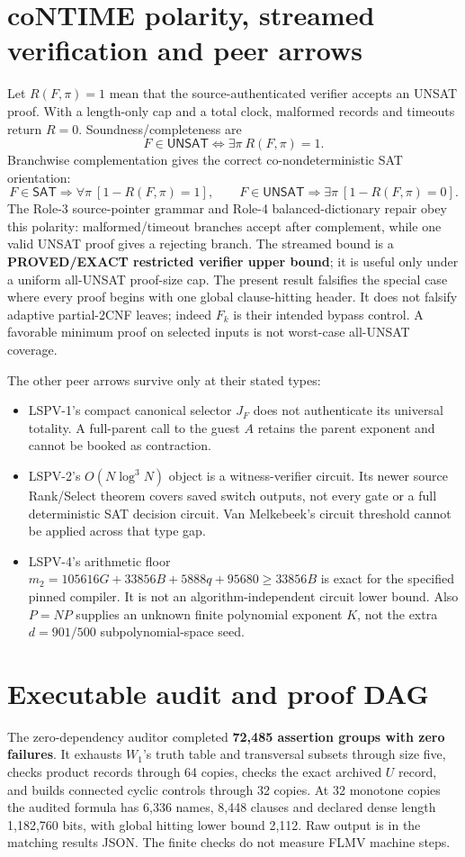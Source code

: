 \documentclass[11pt]{article}
\newcommand{\SAT}{\mathsf{SAT}}
\newcommand{\UNSAT}{\mathsf{UNSAT}}
\newcommand{\status}[1]{\textbf{#1}}
\begin{document}
\section{coNTIME polarity, streamed verification and peer arrows}
Let $R(F,\pi)=1$ mean that the source-authenticated verifier accepts an UNSAT
proof.  With a length-only cap and a total clock, malformed records and
timeouts return $R=0$.  Soundness/completeness are
\[
F\in\UNSAT\iff\exists\pi\ R(F,\pi)=1.                 \tag{7}
\]
Branchwise complementation gives the correct co-nondeterministic SAT
orientation:
\[
F\in\SAT\Rightarrow\forall\pi\ [1-R(F,\pi)=1],\qquad
F\in\UNSAT\Rightarrow\exists\pi\ [1-R(F,\pi)=0].       \tag{8}
\]
The Role-3 source-pointer grammar and Role-4 balanced-dictionary repair obey
this polarity: malformed/timeout branches accept after complement, while one
valid UNSAT proof gives a rejecting branch.  The streamed bound is a
\status{PROVED/EXACT restricted verifier upper bound}; it is useful only
under a uniform all-UNSAT proof-size cap.  The present result falsifies the
special case where every proof begins with one global clause-hitting header.
It does not falsify adaptive partial-2CNF leaves; indeed $F_k$ is their
intended bypass control.  A favorable minimum proof on selected inputs is not
worst-case all-UNSAT coverage.

The other peer arrows survive only at their stated types:
\begin{itemize}
\item LSPV-1's compact canonical selector $J_F$ does not authenticate its
universal totality.  A full-parent call to the guest $A$ retains the parent
exponent and cannot be booked as contraction.
\item LSPV-2's $O(N\log^3N)$ object is a witness-verifier circuit.  Its newer
source Rank/Select theorem covers saved switch outputs, not every gate or a
full deterministic SAT decision circuit.  Van Melkebeek's circuit threshold
cannot be applied across that type gap.
\item LSPV-4's arithmetic floor
$m_2=105616G+33856B+5888q+95680\ge33856B$ is exact for the specified pinned
compiler.  It is not an algorithm-independent circuit lower bound.  Also
$P=NP$ supplies an unknown finite polynomial exponent $K$, not the extra
$d=901/500$ subpolynomial-space seed.
\end{itemize}

\section{Executable audit and proof DAG}
The zero-dependency auditor
completed \textbf{72,485 assertion groups with zero failures}.  It exhausts
$W_1$'s truth table and transversal subsets through size five, checks product
records through 64 copies, checks the exact archived $U$ record, and builds
connected cyclic controls through 32 copies.  At 32 monotone copies the
audited formula has 6,336 names, 8,448 clauses and declared dense length
1,182,760 bits, with global hitting lower bound 2,112.  Raw output is in the
matching results JSON.  The finite checks do not measure FLMV machine steps.
\end{document}

